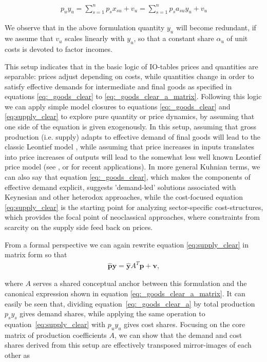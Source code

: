 \begin{align}
    \label{eq:supply_clear}
    p_u y_u = \sum_{s=1}^n p_s x_{su} + v_u = \sum_{s=1}^n p_s a_{su} y_u + v_u
\end{align}

We observe that in the above formulation quantity $y_u$ will become redundant, if we assume that $v_u$ scales linearly with $y_u$, so that a constant share $\alpha_u$ of unit costs is devoted to factor incomes.

This setup indicates that in the basic logic of IO-tables prices and quantities are separable: prices adjust depending on costs, while quantities change in order to satisfy effective demands for intermediate and final goods as specified in equations \eqref{eq:_goods_clear} to \eqref{eq:_goods_clear_a_matrix}. Following this logic we can apply simple model closures to equations \eqref{eq:_goods_clear} and \eqref{eq:supply_clear} to explore pure quantity or price dynamics, by assuming that one side of the equation is given exogenously. In this setup, assuming that gross production (i.e. supply) adapts to effective demand of final goods will lead to the classic Leontief model \citep[][see also section \ref{subsec:Leontief}]{leontief1986input}, while assuming that price increases in inputs translates into price increases of outputs will lead to the somewhat less well known Leontief price model (see \citealp{Weber.2023}, \citealp{Weber.2024} or \citealp{Nikiforos.2024} for recent applications). In more general Kuhnian terms, we can also say that equation \eqref{eq:_goods_clear}, which makes the components of effective demand explicit, suggests 'demand-led' solutions associated with Keynesian and other heterodox approaches, while the cost-focused equation \eqref{eq:supply_clear} is the starting point for analyzing sector-specific cost-structures, which provides the focal point of neoclassical approaches, where constraints from scarcity on the supply side feed back on prices.

From a formal perspective we can again rewrite equation \eqref{eq:supply_clear} in matrix form so that
\begin{align}
     \hat {\mathbf p} \mathbf y = \hat {\mathbf y} A^T \mathbf p + \mathbf v,
\end{align}

where $A$ serves a shared conceptual anchor between this formulation and the canonical expression shown in equation \eqref{eq:_goods_clear_a_matrix}. It can easily be seen that, dividing equation~\eqref{eq:_goods_clear_a} by total production $p_s y_s$ gives demand shares, while applying the same operation to equation~\eqref{eq:supply_clear} with $p_u y_u$ gives cost shares. 
Focusing on the core matrix of production coefficients $A$, we can show that the demand and cost shares derived from this setup are effectively transposed mirror-images of each other as

